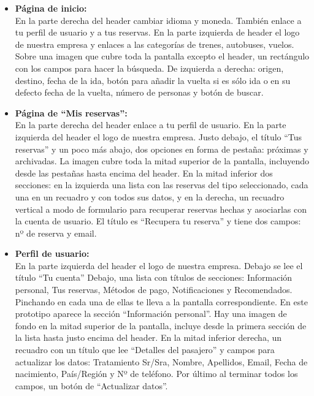 \begin{itemize}
      \item\textbf{Página de inicio:} \\ En la parte derecha del header cambiar idioma y moneda. También enlace a tu perfil de usuario y a tus reservas.
            En la parte izquierda de header el logo de nuestra empresa y enlaces a las categorías de trenes, autobuses, vuelos.
            Sobre una imagen que cubre toda la pantalla excepto el header, un rectángulo con los campos para hacer la búsqueda. De izquierda a derecha: origen, destino, fecha de la ida, botón para añadir la vuelta si es sólo ida o en su defecto fecha de la vuelta, número de personas y botón de buscar.

    \item\textbf{Página de ``Mis reservas'':} \\ En la parte derecha del header enlace a tu perfil de usuario. En la parte izquierda del header el logo de nuestra empresa.
    Justo debajo, el título “Tus reservas” y un poco más abajo, dos opciones en forma de pestaña: próximas y archivadas.
    La imagen cubre toda la mitad superior de la pantalla, incluyendo desde las pestañas hasta encima del header.
    En la mitad inferior dos secciones: en la izquierda una lista con las reservas del tipo seleccionado, cada una en un recuadro y con todos sus datos, y en la derecha, un recuadro vertical a modo de formulario para recuperar reservas hechas y asociarlas con la cuenta de usuario. El título es “Recupera tu reserva” y tiene dos campos: nº de reserva y email.
    
    \item\textbf{Perfil de usuario:} \\ En la parte izquierda del header el logo de nuestra empresa. 
    Debajo se lee el título “Tu cuenta”
    Debajo, una lista con títulos de secciones: Información personal, Tus reservas, Métodos de pago, Notificaciones y Recomendados. Pinchando en cada una de ellas te lleva a la pantalla correspondiente. En este prototipo aparece la sección “Información personal”.
    Hay una imagen de fondo en la mitad superior de la pantalla, incluye desde la primera sección de la lista hasta justo encima del header.
    En la mitad inferior derecha, un recuadro con un título que lee “Detalles del pasajero” y campos para actualizar los datos: Tratamiento Sr/Sra, Nombre, Apellidos, Email, Fecha de nacimiento, País/Región y Nº de teléfono. Por último al terminar todos los campos, un botón de “Actualizar datos”.
    
    
\end{itemize}

